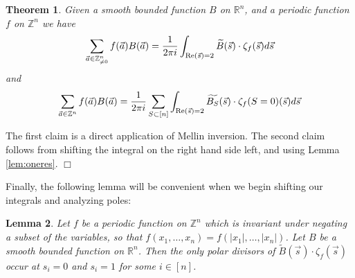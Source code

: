 \documentclass{article}
\def\Z{{\mathbb Z}}
\def\Re{{\rm Re}}
\def\R{{\mathbb R}}
\def\Z{{\mathbb Z}}
\def\wt{\widetilde}
\def\ds{\displaystyle}
\newtheorem{theorem}{Theorem}[section]
\newtheorem{lemma}[theorem]{Lemma}
\newenvironment{proof}{\noindent {\bf Proof:}}{$\Box$ \vspace{2 ex}}
\begin{document}
\begin{theorem}\label{thm:mellinsum}
    Given a smooth bounded function $B$ on $\R^n$, and a periodic function $f$ on $\Z^n$ we have
    $$\ds\sum_{\vec{a}\in \Z_{\neq 0}^n}  f(\vec a)B(\vec{a})= \frac{1}{2\pi i}\int _{\Re(\vec{s})=2} \wt{B}(\vec s)\cdot \zeta_f(\vec{s})d\vec s $$  
    and
    $$\ds\sum_{\vec{a}\in \Z^n}  f(\vec a)B(\vec{a})= \frac{1}{2\pi i}\ds\sum_{S\subset [n]}\int_{\Re(\vec{s})=2} \wt{B_S}(\vec s)\cdot \zeta_f(S=0)(\vec{s})d\vec s $$
\end{theorem}

\begin{proof}
The first claim is a direct application of Mellin inversion. The second claim follows from shifting the integral on the right hand side left, and using Lemma \ref{lem:oneres}. 
\end{proof}

Finally, the following lemma will be convenient when we begin shifting our integrals and analyzing poles:

\begin{lemma}\label{lem:symlatticenopole}
Let $f$ be a periodic function on $\Z^n$ which is invariant under negating a subset of the variables, so that $f(x_1,\dots,x_n)=f(|x_1|,\dots,|x_n|)$. Let $B$ be a smooth bounded function on $\R^n$. Then the only polar divisors of 
$\wt{B}(\vec s)\cdot \zeta_f(\vec s)$ occur at $s_i=0$ and $s_i=1$ for some $i\in[n]$.
\end{lemma}
\end{document}
